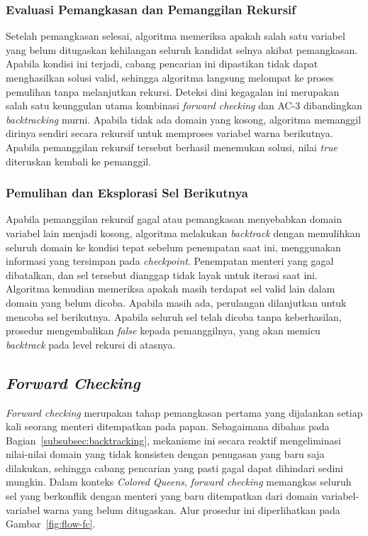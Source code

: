 \subsubsection{Evaluasi Pemangkasan dan Pemanggilan Rekursif}

Setelah pemangkasan selesai, algoritma memeriksa apakah salah satu variabel yang belum ditugaskan kehilangan seluruh kandidat selnya akibat pemangkasan. Apabila kondisi ini terjadi, cabang pencarian ini dipastikan tidak dapat menghasilkan solusi valid, sehingga algoritma langsung melompat ke proses pemulihan tanpa melanjutkan rekursi. Deteksi dini kegagalan ini merupakan salah satu keunggulan utama kombinasi \textit{forward checking} dan AC-3 dibandingkan \textit{backtracking} murni. Apabila tidak ada domain yang kosong, algoritma memanggil dirinya sendiri secara rekursif untuk memproses variabel warna berikutnya. Apabila pemanggilan rekursif tersebut berhasil menemukan solusi, nilai \textit{true} diteruskan kembali ke pemanggil.

\subsubsection{Pemulihan dan Eksplorasi Sel Berikutnya}

Apabila pemanggilan rekursif gagal atau pemangkasan menyebabkan domain variabel lain menjadi kosong, algoritma melakukan \textit{backtrack} dengan memulihkan seluruh domain ke kondisi tepat sebelum penempatan saat ini, menggunakan informasi yang tersimpan pada \textit{checkpoint}. Penempatan menteri yang gagal dibatalkan, dan sel tersebut dianggap tidak layak untuk iterasi saat ini. Algoritma kemudian memeriksa apakah masih terdapat sel valid lain dalam domain yang belum dicoba. Apabila masih ada, perulangan dilanjutkan untuk mencoba sel berikutnya. Apabila seluruh sel telah dicoba tanpa keberhasilan, prosedur mengembalikan \textit{false} kepada pemanggilnya, yang akan memicu \textit{backtrack} pada level rekursi di atasnya.

\subsection{\textit{Forward Checking}}
\label{subsec:flow-fc}

\textit{Forward checking} merupakan tahap pemangkasan pertama yang dijalankan setiap kali seorang menteri ditempatkan pada papan. Sebagaimana dibahas pada Bagian~\ref{subsubsec:backtracking}, mekanisme ini secara reaktif mengeliminasi nilai-nilai domain yang tidak konsisten dengan penugasan yang baru saja dilakukan, sehingga cabang pencarian yang pasti gagal dapat dihindari sedini mungkin. Dalam konteks \textit{Colored Queens}, \textit{forward checking} memangkas seluruh sel yang berkonflik dengan menteri yang baru ditempatkan dari domain variabel-variabel warna yang belum ditugaskan. Alur prosedur ini diperlihatkan pada Gambar~\ref{fig:flow-fc}.

